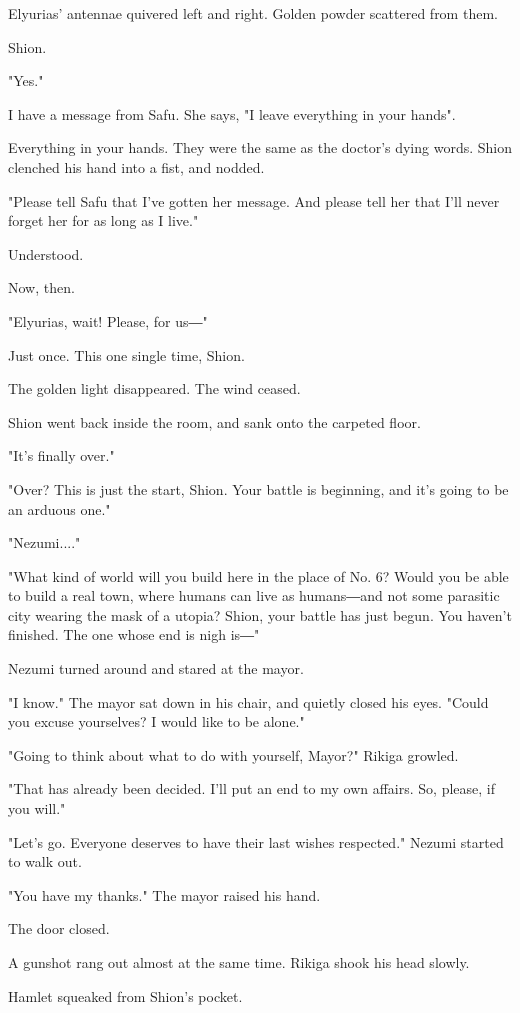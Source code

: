 Elyurias' antennae quivered left and right. Golden powder scattered from
them.

Shion.

"Yes."

I have a message from Safu. She says, "I leave everything in your
hands".

Everything in your hands. They were the same as the doctor's dying
words. Shion clenched his hand into a fist, and nodded.

"Please tell Safu that I've gotten her message. And please tell her that
I'll never forget her for as long as I live."

Understood.

Now, then.

"Elyurias, wait! Please, for us―"

Just once. This one single time, Shion.

The golden light disappeared. The wind ceased.

Shion went back inside the room, and sank onto the carpeted floor.

"It's finally over."

"Over? This is just the start, Shion. Your battle is beginning, and it's
going to be an arduous one."

"Nezumi...."

"What kind of world will you build here in the place of No. 6? Would you
be able to build a real town, where humans can live as humans―and not
some parasitic city wearing the mask of a utopia? Shion, your battle has
just begun. You haven't finished. The one whose end is nigh is―"

Nezumi turned around and stared at the mayor.

"I know." The mayor sat down in his chair, and quietly closed his eyes.
"Could you excuse yourselves? I would like to be alone."

"Going to think about what to do with yourself, Mayor?" Rikiga growled.

"That has already been decided. I'll put an end to my own affairs. So,
please, if you will."

"Let's go. Everyone deserves to have their last wishes respected."
Nezumi started to walk out.

"You have my thanks." The mayor raised his hand.

The door closed.

A gunshot rang out almost at the same time. Rikiga shook his head
slowly.

Hamlet squeaked from Shion's pocket.

